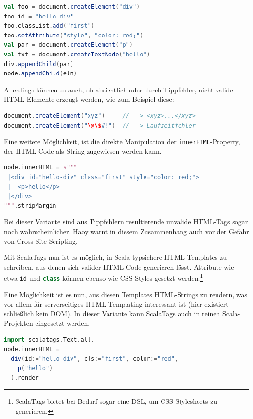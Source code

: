 \documentclass[a4paper, 12pt, hidelinks, listof=totoc, listoftables=totoc, bibliography=totoc]{scrreprt}
\newcommand{\code}[1]{\lstinline[language=Scala, style=inline]|#1|}
\begin{document}
\begin{lstlisting}[language=Scala, caption={HTML-Generierung mit Scala-js-dom und Nodes.}]
val foo = document.createElement("div")
foo.id = "hello-div"
foo.classList.add("first")
foo.setAttribute("style", "color: red;")
val par = document.createElement("p")
val txt = document.createTextNode("hello")
div.appendChild(par)
node.appendChild(elm)
\end{lstlisting}

Allerdings können so auch, ob absichtlich oder durch Tippfehler, nicht-valide HTML-Elemente erzeugt werden, wie zum Beispiel diese:
\begin{lstlisting}[language=Scala, style=snippet]
document.createElement("xyz")     // --> <xyz>...</xyz>
document.createElement("\@\$#!")  // --> Laufzeitfehler
\end{lstlisting}

Eine weitere Möglichkeit, ist die direkte Manipulation der \code{innerHTML}-Property, der HTML-Code als String zugewiesen werden kann.

\begin{lstlisting}[language=Scala, caption={HTML-Generierung mit Scala-js-dom und Strings.}]
node.innerHTML = s"""
 |<div id="hello-div" class="first" style="color: red;">
 |  <p>hello</p>
 |</div>
""".stripMargin
\end{lstlisting}

Bei dieser Variante sind aus Tippfehlern resultierende unvalide HTML-Tags sogar noch wahrscheinlicher. Haoy warnt in diesem Zusammenhang auch vor der Gefahr von Cross-Site-Scripting.\cite[\#HelloWorld:HTML]{haoyi.HOS}

Mit ScalaTags nun ist es möglich, in Scala typsichere HTML-Templates zu schreiben, aus denen sich valider HTML-Code generieren lässt. Attribute wie etwa \code{id} und \code{class} können ebenso wie CSS-Styles gesetzt werden.\footnote{ScalaTags bietet bei Bedarf sogar eine DSL, um CSS-Stylesheets zu generieren.}

Eine Möglichkeit ist es nun, aus diesen Templates HTML-Strings zu rendern, was vor allem für serverseitiges HTML-Templating interessant ist (hier existiert schließlich kein DOM). In dieser Variante kann ScalaTags auch in reinen Scala-Projekten eingesetzt werden.

\begin{lstlisting}[language=Scala, caption={HTML-Generierung mit ScalaTags und Strings.}]
import scalatags.Text.all._
node.innerHTML =
  div(id:="hello-div", cls:="first", color:="red",
    p("hello")
  ).render
\end{lstlisting}
\end{document}
